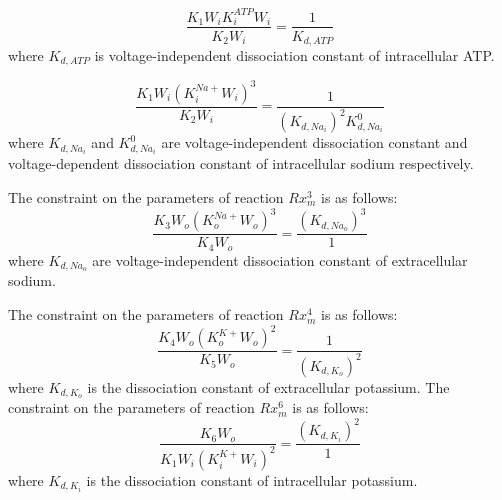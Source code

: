 \begin{equation}
      \label{eq:constraint1_ATP}
\dfrac{K_1W_iK_i^{ATP}W_i}{K_2W_i} = \dfrac{1}{K_{d,ATP}}
\end{equation}
where $K_{d,ATP}$ is voltage-independent dissociation constant of intracellular ATP.

\begin{equation}
      \label{eq:constraint1_Na}
\dfrac{K_1W_i(K_i^{Na+}W_i)^3}{K_2W_i} = \dfrac{1}{(K_{d,Na_i})^2 K_{d,Na_i}^0}
\end{equation}
where $K_{d,Na_i}$ and $K_{d,Na_i}^0$ are voltage-independent dissociation constant and voltage-dependent dissociation constant of intracellular sodium respectively.

The constraint on the parameters of reaction $Rx_m^3$ is as follows:
\begin{equation}
      \label{eq:constraint2}
\dfrac{K_3W_o(K_o^{Na+}W_o)^3}{K_4W_o} = \dfrac{(K_{d,Na_o})^3}{1}
\end{equation}
where $K_{d,Na_o}$ are voltage-independent dissociation constant of extracellular sodium.

The constraint on the parameters of reaction $Rx_m^4$ is as follows:
\begin{equation}
      \label{eq:constraint3}
\dfrac{K_4W_o(K_o^{K+}W_o)^2}{K_5W_o} = \dfrac{1}{(K_{d,K_o})^2}
\end{equation}
where $K_{d,K_o}$ is the dissociation constant of extracellular potassium.
The constraint on the parameters of reaction $Rx_m^6$ is as follows:
\begin{equation}
      \label{eq:constraint4}
\dfrac{K_6W_o}{K_1W_i(K_i^{K+}W_i)^2} = \dfrac{(K_{d,K_i})^2}{1}
\end{equation}
where $K_{d,K_i}$ is the dissociation constant of intracellular potassium.

